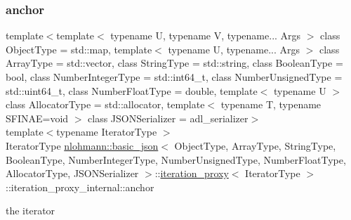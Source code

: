 \subsubsection{\texorpdfstring{anchor}{anchor}}
{\footnotesize\ttfamily template$<$template$<$ typename U, typename V, typename... Args $>$ class Object\+Type = std\+::map, template$<$ typename U, typename... Args $>$ class Array\+Type = std\+::vector, class String\+Type  = std\+::string, class Boolean\+Type  = bool, class Number\+Integer\+Type  = std\+::int64\+\_\+t, class Number\+Unsigned\+Type  = std\+::uint64\+\_\+t, class Number\+Float\+Type  = double, template$<$ typename U $>$ class Allocator\+Type = std\+::allocator, template$<$ typename T, typename S\+F\+I\+N\+A\+E=void $>$ class J\+S\+O\+N\+Serializer = adl\+\_\+serializer$>$ \\
template$<$typename Iterator\+Type $>$ \\
Iterator\+Type \hyperlink{classnlohmann_1_1basic__json}{nlohmann\+::basic\+\_\+json}$<$ Object\+Type, Array\+Type, String\+Type, Boolean\+Type, Number\+Integer\+Type, Number\+Unsigned\+Type, Number\+Float\+Type, Allocator\+Type, J\+S\+O\+N\+Serializer $>$\+::\hyperlink{classnlohmann_1_1basic__json_1_1iteration__proxy}{iteration\+\_\+proxy}$<$ Iterator\+Type $>$\+::iteration\+\_\+proxy\+\_\+internal\+::anchor\hspace{0.3cm}{\ttfamily [private]}}



the iterator 

\mbox{\label{classnlohmann_1_1basic__json_1_1iteration__proxy_1_1iteration__proxy__internal_a80587417690d6b2cabc8edee491cf1ba}} 
